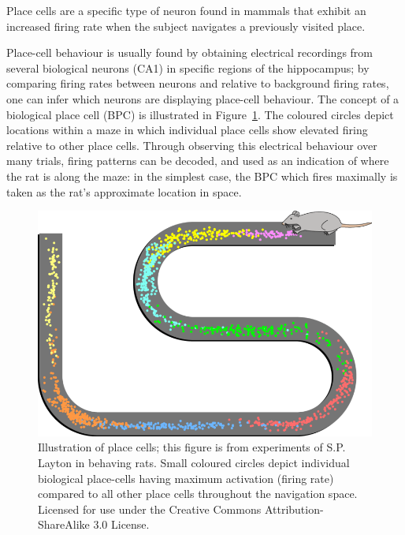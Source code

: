 Place cells are a specific type of neuron found in mammals that exhibit an increased firing rate when the subject navigates a previously visited place.

Place-cell behaviour is usually found by obtaining electrical recordings from several biological neurons (CA1) in specific regions of the hippocampus; by comparing firing rates between neurons and relative to background firing rates, one can infer which neurons are displaying place-cell behaviour. The concept of a biological place cell (BPC) is illustrated in Figure~\ref{fig:Maze}.  The coloured circles depict locations within a maze in which individual place cells show elevated firing relative to other place cells.  Through observing this electrical behaviour over many trials, firing patterns can be decoded, and used as an indication of where the rat is along the maze: in the simplest case, the BPC which fires maximally is taken as the rat's approximate location in space. 

\begin{figure}[!t]
\centering
\includegraphics[width=.6\linewidth]{./gfx/Chapter01/bio_place_cells_rat.png}
\caption{Illustration of place cells; this figure is from experiments of S.P. Layton in behaving rats. Small coloured circles depict individual biological place-cells having maximum activation (firing rate) compared to all other place cells throughout the navigation space. Licensed for use under the Creative Commons Attribution\--Share\-A\-like 3.0 License.}
\label{fig:Maze}
\end{figure}

